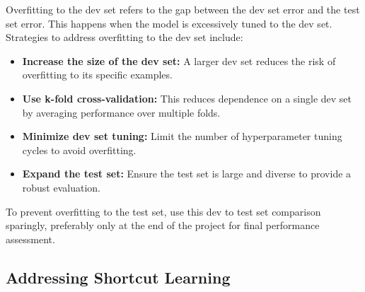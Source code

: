 \documentclass[12pt,openany]{book}
\begin{document}
Overfitting to the dev set refers to the gap between the dev set error and the test set error. This happens when the model is excessively tuned to the dev set. Strategies to address overfitting to the dev set include:
\begin{itemize}
    \item \textbf{Increase the size of the dev set:} A larger dev set reduces the risk of overfitting to its specific examples.
    \item \textbf{Use k-fold cross-validation:} This reduces dependence on a single dev set by averaging performance over multiple folds.
    \item \textbf{Minimize dev set tuning:} Limit the number of hyperparameter tuning cycles to avoid overfitting.
    \item \textbf{Expand the test set:} Ensure the test set is large and diverse to provide a robust evaluation.
\end{itemize}

\begin{notebox}
To prevent overfitting to the test set, use this dev to test set comparison sparingly, preferably only at the end of the project for final performance assessment.
\end{notebox}

\subsection{Addressing Shortcut Learning}
\end{document}
